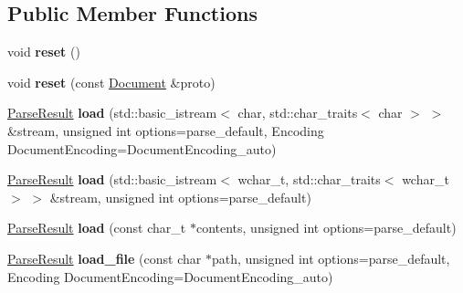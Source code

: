 \subsection*{Public Member Functions}
\begin{DoxyCompactItemize}
\item 
\hypertarget{classphys_1_1xml_1_1Document_aadb3e68da9cf95b1193f915136f9a7e5}{
void {\bfseries reset} ()}
\label{dd/d44/classphys_1_1xml_1_1Document_aadb3e68da9cf95b1193f915136f9a7e5}

\item 
\hypertarget{classphys_1_1xml_1_1Document_a8d79b0e71457e8a64f331fd4cc117a86}{
void {\bfseries reset} (const \hyperlink{classphys_1_1xml_1_1Document}{Document} \&proto)}
\label{dd/d44/classphys_1_1xml_1_1Document_a8d79b0e71457e8a64f331fd4cc117a86}

\item 
\hypertarget{classphys_1_1xml_1_1Document_a97ef7a041dac21e0aa32f869a026ea03}{
\hyperlink{structphys_1_1xml_1_1ParseResult}{ParseResult} {\bfseries load} (std::basic\_\-istream$<$ char, std::char\_\-traits$<$ char $>$ $>$ \&stream, unsigned int options=parse\_\-default, Encoding DocumentEncoding=DocumentEncoding\_\-auto)}
\label{dd/d44/classphys_1_1xml_1_1Document_a97ef7a041dac21e0aa32f869a026ea03}

\item 
\hypertarget{classphys_1_1xml_1_1Document_a09d74505371b5746d4762daa20a7bb25}{
\hyperlink{structphys_1_1xml_1_1ParseResult}{ParseResult} {\bfseries load} (std::basic\_\-istream$<$ wchar\_\-t, std::char\_\-traits$<$ wchar\_\-t $>$ $>$ \&stream, unsigned int options=parse\_\-default)}
\label{dd/d44/classphys_1_1xml_1_1Document_a09d74505371b5746d4762daa20a7bb25}

\item 
\hypertarget{classphys_1_1xml_1_1Document_a1551e495e2b83897bd8288fc001c6c54}{
\hyperlink{structphys_1_1xml_1_1ParseResult}{ParseResult} {\bfseries load} (const char\_\-t $\ast$contents, unsigned int options=parse\_\-default)}
\label{dd/d44/classphys_1_1xml_1_1Document_a1551e495e2b83897bd8288fc001c6c54}

\item 
\hypertarget{classphys_1_1xml_1_1Document_ada4835cecb990e3020f1f8f3c347b34b}{
\hyperlink{structphys_1_1xml_1_1ParseResult}{ParseResult} {\bfseries load\_\-file} (const char $\ast$path, unsigned int options=parse\_\-default, Encoding DocumentEncoding=DocumentEncoding\_\-auto)}
\label{dd/d44/classphys_1_1xml_1_1Document_ada4835cecb990e3020f1f8f3c347b34b}


\end{DoxyCompactItemize}
